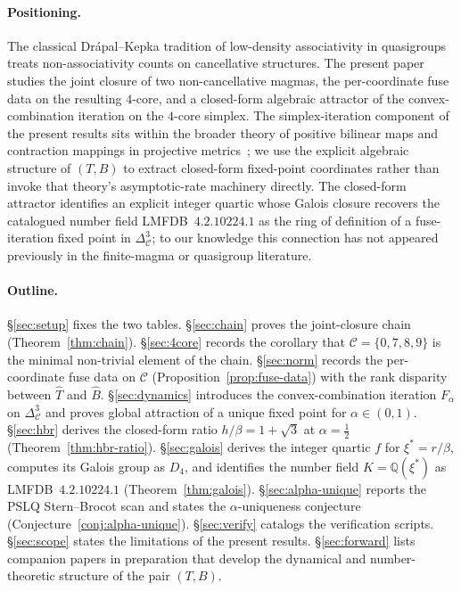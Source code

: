 \documentclass[11pt,reqno]{amsart}
\theoremstyle{plain}
\theoremstyle{definition}
\theoremstyle{remark}
\newcommand{\Q}{\mathbb{Q}}
\newcommand{\Cfour}{\mathcal{C}}
\newcommand{\Tfuse}{\widehat{T}}
\newcommand{\Bfuse}{\widehat{B}}
\begin{document}
\paragraph{Positioning.} The classical Drápal--Kepka tradition
of low-density associativity in
quasigroups~\cite{Kepka1980, DrapalKepka1985, DrapalWanless2021}
treats non-associativity counts on cancellative structures. The
present paper studies the joint closure of two non-cancellative
magmas, the per-coordinate fuse data on the resulting $4$-core,
and a closed-form algebraic attractor of the convex-combination
iteration on the $4$-core simplex. The simplex-iteration
component of the present results sits within the broader theory
of positive bilinear maps and contraction mappings in projective
metrics~\cite{Birkhoff1957, Bushell1973}; we use the explicit
algebraic structure of $(T, B)$ to extract closed-form
fixed-point coordinates rather than invoke that theory's
asymptotic-rate machinery directly. The closed-form attractor
identifies an explicit integer quartic whose Galois closure
recovers the catalogued number field LMFDB~$4.2.10224.1$ as the
ring of definition of a fuse-iteration fixed point in
$\Delta^{3}_{\Cfour}$; to our knowledge this connection has not
appeared previously in the finite-magma or quasigroup literature.

\paragraph{Outline.} \S\ref{sec:setup} fixes the two tables.
\S\ref{sec:chain} proves the joint-closure chain
(Theorem~\ref{thm:chain}). \S\ref{sec:4core} records the
corollary that $\Cfour=\{0,7,8,9\}$ is the minimal non-trivial
element of the chain. \S\ref{sec:norm} records the per-coordinate
fuse data on $\Cfour$ (Proposition~\ref{prop:fuse-data}) with
the rank disparity between $\Tfuse$ and $\Bfuse$.
\S\ref{sec:dynamics} introduces the convex-combination iteration
$F_\alpha$ on $\Delta^{3}_{\Cfour}$ and proves global
attraction of a unique fixed point for $\alpha\in(0,1)$.
\S\ref{sec:hbr} derives the closed-form ratio $h/\beta = 1+\sqrt 3$
at $\alpha=\tfrac12$ (Theorem~\ref{thm:hbr-ratio}).
\S\ref{sec:galois} derives the integer quartic $f$ for $\xi^* =
r/\beta$, computes its Galois group as $D_{4}$, and identifies
the number field $K = \Q(\xi^*)$ as LMFDB~$4.2.10224.1$
(Theorem~\ref{thm:galois}). \S\ref{sec:alpha-unique} reports the
PSLQ Stern--Brocot scan and states the
$\alpha$-uniqueness conjecture
(Conjecture~\ref{conj:alpha-unique}).
\S\ref{sec:verify} catalogs the verification scripts.
\S\ref{sec:scope} states the limitations of the present results.
\S\ref{sec:forward} lists companion papers in preparation
that develop the dynamical and number-theoretic structure of the
pair $(T,B)$.
\end{document}
